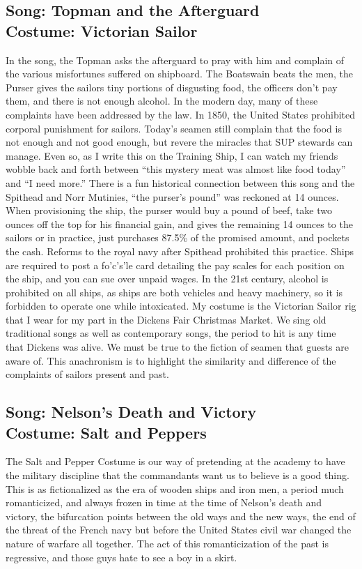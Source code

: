 \documentclass{article}[12pt,letterpaper]
\begin{document}
\subsection{Song: Topman and the Afterguard\\
Costume: Victorian Sailor}
In the song, the Topman asks the afterguard to pray with him and complain of the various misfortunes suffered on shipboard. The Boatswain beats the men, the Purser gives the sailors tiny portions of disgusting food, the officers don’t pay them, and there is not enough alcohol. In the modern day, many of these complaints have been addressed by the law. In 1850, the United States prohibited corporal punishment for sailors. Today’s seamen still complain that the food is not enough and not good enough, but revere the miracles that SUP stewards can manage. Even so, as I write this on the Training Ship, I can watch my friends wobble back and forth between “this mystery meat was almost like food today” and “I need more.” There is a fun historical connection between this song and the Spithead and Norr Mutinies, “the purser’s pound” was reckoned at 14 ounces. When provisioning the ship, the purser would buy a pound of beef, take two ounces off the top for his financial gain, and gives the remaining 14 ounces to the sailors or in practice, just purchases 87.5\% of the promised amount, and pockets the cash. Reforms to the royal navy after Spithead prohibited this practice. Ships are required to post a fo’c’s’le card detailing the pay scales for each position on the ship, and you can sue over unpaid wages. In the 21st century, alcohol is prohibited on all ships, as ships are both vehicles and heavy machinery, so it is forbidden to operate one while intoxicated. My costume is the Victorian Sailor rig that I wear for my part in the Dickens Fair Christmas Market. We sing old traditional songs as well as contemporary songs, the period to hit is any time that Dickens was alive. We must be true to the fiction of seamen that guests are aware of. This anachronism is to highlight the similarity and difference of the complaints of sailors present and past.
\subsection{Song: Nelson’s Death and Victory\\
Costume: Salt and Peppers}
The Salt and Pepper Costume is our way of pretending at the academy to have the military discipline that the commandants want us to believe is a good thing. This is as fictionalized as the era of wooden ships and iron men, a period much romanticized, and always frozen in time at the time of Nelson’s death and victory, the bifurcation points between the old ways and the new ways, the end of the threat of the French navy but before the United States civil war changed the nature of warfare all together. The act of this romanticization of the past is regressive, and those guys hate to see a boy in a skirt.
\end{document}
